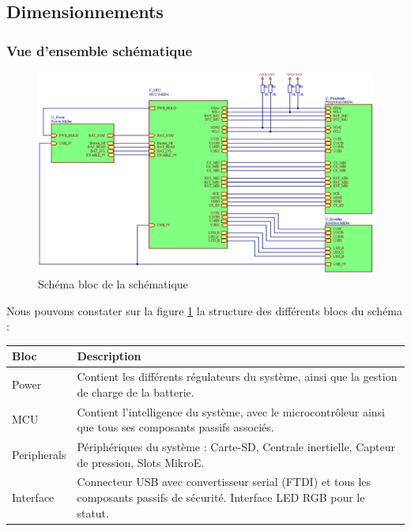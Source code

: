 \subsection{Dimensionnements} \label{ssec:num31}
{
	\subsubsection{Vue d'ensemble schématique} \label{sssec:SchemaBloc} \vspace{-6mm}
	{
		\begin{figure}[th]
			\centering
			\includegraphics[width=\textwidth]{Figures/Dev-SCH/schemaBloc}
			\caption{Schéma bloc de la schématique}
			\label{fig:schemablocSCH}
		\end{figure} \vspace{-5mm}
		Nous pouvons constater sur la figure \ref{fig:schemablocSCH} la structure des différents blocs du schéma : 
		
		\begin{tabularx}{16cm}{|X|X|}
			\hline
			Bloc & Description \\
			\hline
			\hline
			Power & Contient les différents régulateurs du système, ainsi que la gestion de charge de la batterie. \\
			\hline
			MCU & Contient l'intelligence du système, avec le microcontrôleur ainsi que tous ses composants passifs associés. \\
			\hline
			Peripherals & Périphériques du système : Carte-SD, Centrale inertielle, Capteur de pression, Slots MikroE. \\ 
			\hline
			Interface & Connecteur USB avec convertisseur serial (FTDI) et tous les composants passifs de sécurité. Interface LED RGB pour le statut. \\
			\hline
		\end{tabularx}
	}


}

